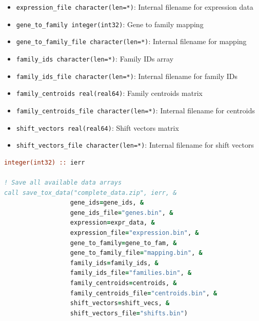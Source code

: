 \documentclass[11pt]{article}
\begin{document}
\begin{enumerate}
\begin{itemize}
\begin{itemize}
	      	      	\item \texttt{expression\_file character(len=*)}: Internal filename for
	      	      	      expression data
	      	      	      
	      	      	\item \texttt{gene\_to\_family integer(int32)}: Gene to family mapping
	      	      	      
	      	      	\item \texttt{gene\_to\_family\_file character(len=*)}: Internal filename
	      	      	      for mapping
	      	      	      
	      	      	\item \texttt{family\_ids character(len=*)}: Family IDs array
	      	      	      
	      	      	\item \texttt{family\_ids\_file character(len=*)}: Internal filename
	      	      	      for family IDs
	      	      	      
	      	      	\item \texttt{family\_centroids real(real64)}: Family centroids matrix
	      	      	      
	      	      	\item \texttt{family\_centroids\_file character(len=*)}: Internal filename
	      	      	      for centroids
	      	      	      
	      	      	\item \texttt{shift\_vectors real(real64)}: Shift vectors matrix
	      	      	      
	      	      	\item \texttt{shift\_vectors\_file character(len=*)}: Internal filename
	      	      	      for shift vectors
	      	      \end{itemize}
	      	      \begin{lstlisting}[language=Fortran, caption={Save Complete Data Archive}]
integer(int32) :: ierr

! Save all available data arrays
call save_tox_data("complete_data.zip", ierr, &
                  gene_ids=gene_ids, &
                  gene_ids_file="genes.bin", &
                  expression=expr_data, &
                  expression_file="expression.bin", &
                  gene_to_family=gene_to_fam, &
                  gene_to_family_file="mapping.bin", &
                  family_ids=family_ids, &
                  family_ids_file="families.bin", &
                  family_centroids=centroids, &
                  family_centroids_file="centroids.bin", &
                  shift_vectors=shift_vecs, &
                  shift_vectors_file="shifts.bin")
	      	      \end{lstlisting}
	      	      

\end{itemize}
\end{enumerate}
\end{document}
